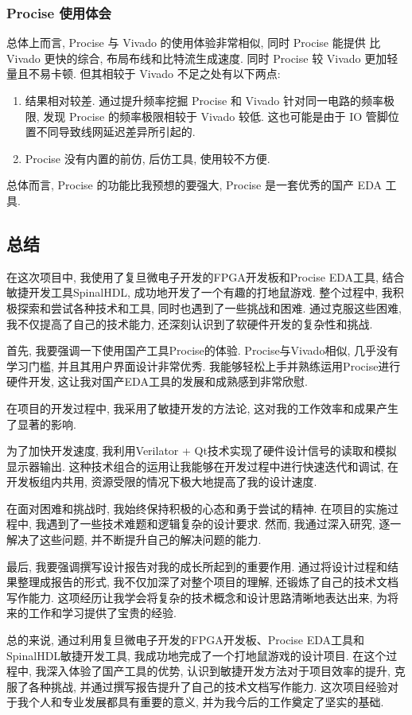 \subsubsection{Procise 使用体会}

总体上而言, Procise 与 Vivado 的使用体验非常相似, 同时 Procise 能提供
比 Vivado 更快的综合, 布局布线和比特流生成速度. 同时 Procise 较 Vivado
更加轻量且不易卡顿. 但其相较于 Vivado 不足之处有以下两点: 

\begin{enumerate}
    \item 结果相对较差. 通过提升频率挖掘 Procise 和 Vivado 针对同一电路的频率极限, 
    发现 Procise 的频率极限相较于 Vivado 较低. 这也可能是由于 IO 管脚位置不同导致线网延迟差异所引起的.
    \item Procise 没有内置的前仿, 后仿工具, 使用较不方便. 
\end{enumerate}

总体而言, Procise 的功能比我预想的要强大, Procise 是一套优秀的国产 EDA 工具. 

\subsection{总结}

在这次项目中, 我使用了复旦微电子开发的FPGA开发板和Procise EDA工具, 结合敏捷开发工具SpinalHDL, 成功地开发了一个有趣的打地鼠游戏. 整个过程中, 我积极探索和尝试各种技术和工具, 同时也遇到了一些挑战和困难. 通过克服这些困难, 我不仅提高了自己的技术能力, 还深刻认识到了软硬件开发的复杂性和挑战. 

首先, 我要强调一下使用国产工具Procise的体验. Procise与Vivado相似, 几乎没有学习门槛, 并且其用户界面设计非常优秀. 我能够轻松上手并熟练运用Procise进行硬件开发, 这让我对国产EDA工具的发展和成熟感到非常欣慰. 

在项目的开发过程中, 我采用了敏捷开发的方法论, 这对我的工作效率和成果产生了显著的影响. 

为了加快开发速度, 我利用Verilator + Qt技术实现了硬件设计信号的读取和模拟显示器输出. 这种技术组合的运用让我能够在开发过程中进行快速迭代和调试, 在开发板组内共用, 资源受限的情况下极大地提高了我的设计速度. 

在面对困难和挑战时, 我始终保持积极的心态和勇于尝试的精神. 在项目的实施过程中, 我遇到了一些技术难题和逻辑复杂的设计要求. 然而, 我通过深入研究, 逐一解决了这些问题, 并不断提升自己的解决问题的能力. 

最后, 我要强调撰写设计报告对我的成长所起到的重要作用. 通过将设计过程和结果整理成报告的形式, 我不仅加深了对整个项目的理解, 还锻炼了自己的技术文档写作能力. 这项经历让我学会将复杂的技术概念和设计思路清晰地表达出来, 为将来的工作和学习提供了宝贵的经验. 

总的来说, 通过利用复旦微电子开发的FPGA开发板、Procise EDA工具和SpinalHDL敏捷开发工具, 我成功地完成了一个打地鼠游戏的设计项目. 在这个过程中, 我深入体验了国产工具的优势, 认识到敏捷开发方法对于项目效率的提升, 克服了各种挑战, 并通过撰写报告提升了自己的技术文档写作能力. 这次项目经验对于我个人和专业发展都具有重要的意义, 并为我今后的工作奠定了坚实的基础. 